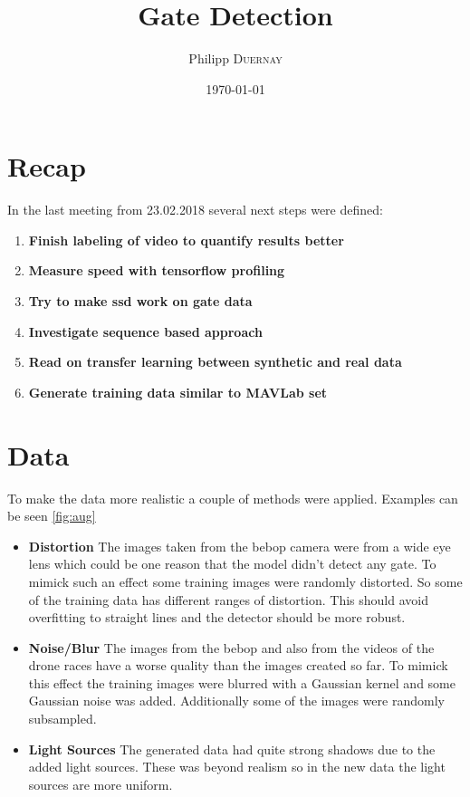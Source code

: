 \documentclass{article}
\title{Gate Detection} %
\author{Philipp \textsc{Duernay}} %
\date{\today} %
\begin{document}
\maketitle


\section{Recap}
In the last meeting from 23.02.2018 several next steps were defined:
\begin{enumerate}
	\item \textbf{Finish labeling of video to quantify results better}
	\item \textbf{Measure speed with tensorflow profiling}
	\item \textbf{Try to make ssd work on gate data}
	\item \textbf{Investigate sequence based approach}
	\item \textbf{Read on transfer learning between synthetic and real data}
	\item \textbf{Generate training data similar to MAVLab set}
\end{enumerate}

\section{Data}

To make the data more realistic a couple of methods were applied. Examples can be seen \autoref{fig:aug}

\begin{itemize}
	\item \textbf{Distortion} The images taken from the bebop camera were from a wide eye lens which could be one reason that the model didn't detect any gate. To mimick such an effect some training images were randomly distorted. So some of the training data has different ranges of distortion. This should avoid overfitting to straight lines and the detector should be more robust.
	\item \textbf{Noise/Blur} The images from the bebop and also from the videos of the drone races have a worse quality than the images created so far. To mimick this effect the training images were blurred with a Gaussian kernel and some Gaussian noise was added. Additionally some of the images were randomly subsampled.
	\item \textbf{Light Sources} The generated data had quite strong shadows due to the added light sources. These was beyond realism so in the new data the light sources are more uniform.
\end{itemize}
\end{document}
